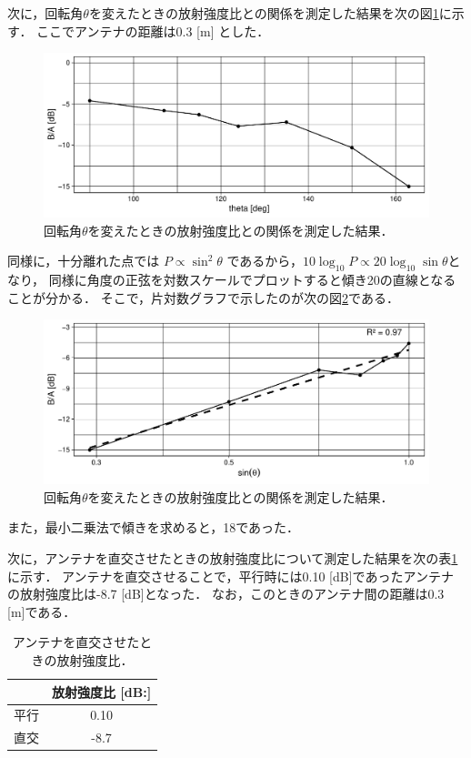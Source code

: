 \documentclass[uplatex,dvipdfmx,a4j,12pt]{jsarticle}
\begin{document}
次に，回転角$\theta$を変えたときの放射強度比との関係を測定した結果を次の図\ref{fig:5-4}に示す．
ここでアンテナの距離は0.3 [m] とした．
\begin{figure}[H]
    \centering
    \includegraphics[width=\linewidth]{data/5_3/gain.pdf}
    \caption{回転角$\theta$を変えたときの放射強度比との関係を測定した結果．}
    \label{fig:5-4}
\end{figure}
同様に，十分離れた点では $P \propto \sin^2 \theta$ であるから，$10\log_{10} P \propto 20 \log_{10} \sin \theta$となり，
同様に角度の正弦を対数スケールでプロットすると傾き20の直線となることが分かる．
そこで，片対数グラフで示したのが次の図\ref{fig:5-5}である．
\begin{figure}[H]
    \centering
    \includegraphics[width=\linewidth]{data/5_3/gain2.pdf}
    \caption{回転角$\theta$を変えたときの放射強度比との関係を測定した結果．}
    \label{fig:5-5}
\end{figure}
また，最小二乗法で傾きを求めると，18であった．

次に，アンテナを直交させたときの放射強度比について測定した結果を次の表\ref{table:5-1}に示す．
アンテナを直交させることで，平行時には0.10 [dB]であったアンテナの放射強度比は-8.7 [dB]となった．
なお，このときのアンテナ間の距離は0.3 [m]である．
\begin{table}[H]
    \centering
    \caption{アンテナを直交させたときの放射強度比．}
    \label{table:5-1}
    \begin{tabular}{cc}
        \hline
        & 放射強度比 [dB:]\\
        \hline
        \hline
        平行 & 0.10\\
        直交 & -8.7\\
        \hline
    \end{tabular}
\end{table}
\end{document}
